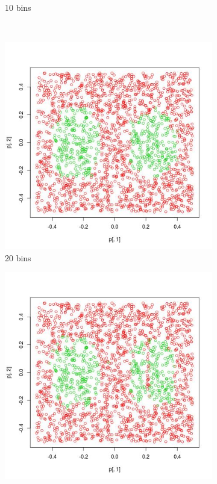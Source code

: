 \documentclass[12pt, a4paper]{article}
\begin{document}
\begin{figure}
\begin{subfigure}[b]{0.42\textwidth}
        \caption{10 bins}
    \end{subfigure}
    ~ %
    \begin{subfigure}[b]{0.42\textwidth}
        \includegraphics[width=\textwidth]{prediccion8}
        \caption{20 bins}
    \end{subfigure}
    \begin{subfigure}[b]{0.42\textwidth}
        \includegraphics[width=\textwidth]{prediccion11}

\end{subfigure}
\end{figure}
\end{document}
